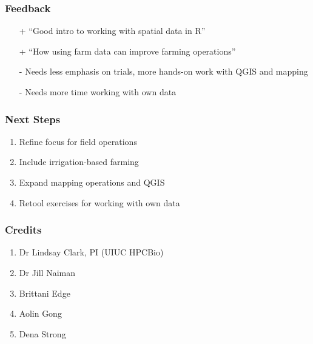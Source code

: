 \documentclass[11pt]{beamer}
\begin{document}
\begin{frame}[fragile]
\frametitle{Feedback}
  \begin{enumerate}[label=\arabic*]
    \item[+]  “Good intro to working with spatial data in R”
    \item[+]  “How using farm data can improve farming operations”
    \item[-]  Needs less emphasis on trials, more hands-on work with QGIS and mapping
    \item[-]  Needs more time working with own data
  \end{enumerate}
\end{frame}

\begin{frame}[fragile]
\frametitle{Next Steps}
  \begin{enumerate}[label=\arabic*]
    \item  Refine focus for field operations
    \item  Include irrigation-based farming
    \item  Expand mapping operations and QGIS
    \item  Retool exercises for working with own data
  \end{enumerate}
\end{frame}

\begin{frame}[fragile]
\frametitle{Credits}
  \begin{enumerate}[label=\arabic*]
    \item  Dr Lindsay Clark, PI (UIUC HPCBio)
    \item  Dr Jill Naiman
    \item  Brittani Edge
    \item  Aolin Gong
    \item  Dena Strong
  \end{enumerate}
\end{frame}

\end{document}
